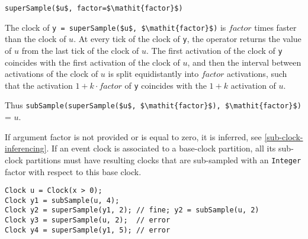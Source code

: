 \begin{operatordefinition}[superSample]
\begin{synopsis}\begin{lstlisting}
superSample($u$, factor=$\mathit{factor}$)
\end{lstlisting}\end{synopsis}
\begin{semantics}
The clock of \lstinline!y = superSample($u$, $\mathit{factor}$)! is $\mathit{factor}$ times faster than the clock of $u$.  At every tick of the clock of \lstinline!y!, the operator returns the value of $u$ from the last tick of the clock of $u$.  The first activation of the clock of \lstinline!y! coincides with the first activation of the clock of $u$, and then the interval between activations of the clock of $u$ is split equidistantly into $\mathit{factor}$ activations, such that the activation $1 + k \cdot \mathit{factor}$ of \lstinline!y! coincides with the $1 + k$ activation of $u$.
\begin{nonnormative}
Thus \lstinline!subSample(superSample($u$, $\mathit{factor}$), $\mathit{factor}$)! = $u$.
\end{nonnormative}
If argument factor is not provided or is equal to zero, it is inferred, see \cref{sub-clock-inferencing}.  If an event clock is associated to a base-clock partition, all its sub-clock partitions must have resulting clocks that are sub-sampled with an \lstinline!Integer! factor with respect to this base clock.

\begin{example}
\begin{lstlisting}[language=modelica]
Clock u = Clock(x > 0);
Clock y1 = subSample(u, 4);
Clock y2 = superSample(y1, 2); // fine; y2 = subSample(u, 2)
Clock y3 = superSample(u, 2);  // error
Clock y4 = superSample(y1, 5); // error
\end{lstlisting}
\end{example}
\end{semantics}
\end{operatordefinition}

